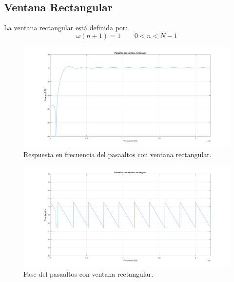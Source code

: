 \subsection{Ventana Rectangular}
La ventana rectangular está definida por:
\begin{equation}
    \omega (n+1)=1 \qquad  0<n<N-1
\end{equation}
\begin{figure}[H]
  \includegraphics[scale=.35]{./images/1/recmod.png}
  \caption{Respuesta en frecuencia del pasaaltos con ventana rectangular.}
\end{figure}
\begin{figure}[H]
  \includegraphics[scale=.35]{./images/1/recfase.png}
  \caption{Fase del pasaaltos con ventana rectangular.}
\end{figure}

